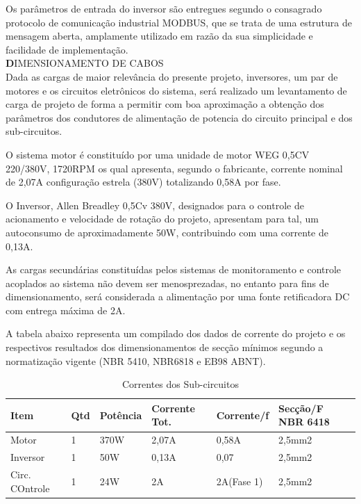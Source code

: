 Os parâmetros de entrada do inversor são entregues segundo o consagrado protocolo de comunicação industrial MODBUS, que se trata de uma estrutura de mensagem aberta, amplamente utilizado em razão da sua simplicidade e facilidade de implementação.\\

\textbf DIMENSIONAMENTO DE CABOS\\

Dada as cargas de maior relevância do presente projeto, inversores, um par de motores e os circuitos eletrônicos do sistema, será realizado um levantamento de carga de projeto de forma a permitir com boa aproximação a obtenção dos parâmetros dos condutores de alimentação de potencia do circuito principal e dos sub-circuitos.

    O sistema motor é constituído por uma unidade de motor WEG 0,5CV 220/380V, 1720RPM os qual apresenta, segundo o fabricante, corrente nominal de 2,07A configuração estrela (380V) totalizando 0,58A por fase.
    
    O Inversor, Allen Breadley 0,5Cv 380V, designados para o controle de acionamento e velocidade de rotação do projeto, apresentam para tal, um autoconsumo de aproximadamente 50W, contribuindo com uma corrente de 0,13A.
    
    As cargas secundárias constituídas pelos sistemas de monitoramento e controle acoplados ao sistema não devem  ser menosprezadas, no entanto para fins de dimensionamento, será considerada a alimentação por uma fonte retificadora DC com entrega máxima de 2A.
    
    A tabela abaixo representa um compilado dos dados de corrente do projeto e os respectivos resultados dos dimensionamentos de secção mínimos segundo a normatização vigente (NBR 5410, NBR6818 e EB98 ABNT).
    
    \begin{table}[h]
	\centering
	\label{tab01}
	
	\begin{tabular}{llllll}
		\toprule
		\textbf{Item} & \textbf{Qtd} & 
        \textbf{Potência} & \textbf{Corrente Tot.}  & \textbf{Corrente/f}  & 
        \textbf{Secção/F NBR 6418} \\
		\midrule
		Motor & 1 & 370W & 2,07A & 0,58A & 2,5mm2 \\
		Inversor & 1 & 50W & 0,13A & 0,07 & 2,5mm2 \\
		Circ. COntrole & 1 & 24W & 2A & 2A(Fase 1) & 2,5mm2 \\
		\bottomrule
	\end{tabular}

	\caption{Correntes dos Sub-circuitos}
\end{table}

